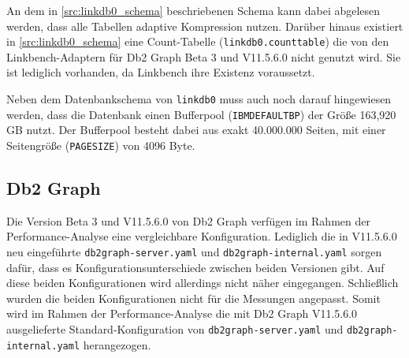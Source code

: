 An dem in \autoref{src:linkdb0_schema} beschriebenen Schema kann dabei abgelesen werden, dass alle Tabellen adaptive Kompression nutzen. Darüber hinaus existiert in \autoref{src:linkdb0_schema} eine Count-Tabelle (\texttt{linkdb0.counttable}) die von den Linkbench-Adaptern für Db2 Graph Beta 3 und V11.5.6.0 nicht genutzt wird. Sie ist lediglich vorhanden, da Linkbench ihre Existenz voraussetzt. 

Neben dem Datenbankschema von \texttt{linkdb0} muss auch noch darauf hingewiesen werden, dass die Datenbank einen Bufferpool (\texttt{IBMDEFAULTBP}) der Größe 163,920 GB nutzt. Der Bufferpool besteht dabei aus exakt 40.000.000 Seiten, mit einer Seitengröße (\texttt{PAGESIZE}) von 4096 Byte.

\subsection{Db2 Graph}
Die Version Beta 3 und V11.5.6.0 von Db2 Graph verfügen im Rahmen der Performance-Analyse eine vergleichbare Konfiguration. Lediglich die in V11.5.6.0 neu eingeführte \texttt{db2graph-server.yaml} und \texttt{db2graph-internal.yaml} sorgen dafür, dass es Konfigurationsunterschiede zwischen beiden Versionen gibt. Auf diese beiden Konfigurationen wird allerdings nicht näher eingegangen. Schließlich wurden die beiden Konfigurationen nicht für die Messungen angepasst. Somit wird im Rahmen der Performance-Analyse die mit Db2 Graph V11.5.6.0 ausgelieferte Standard-Konfiguration von \texttt{db2graph-server.yaml} und \texttt{db2graph-internal.yaml} her\-angezogen.

